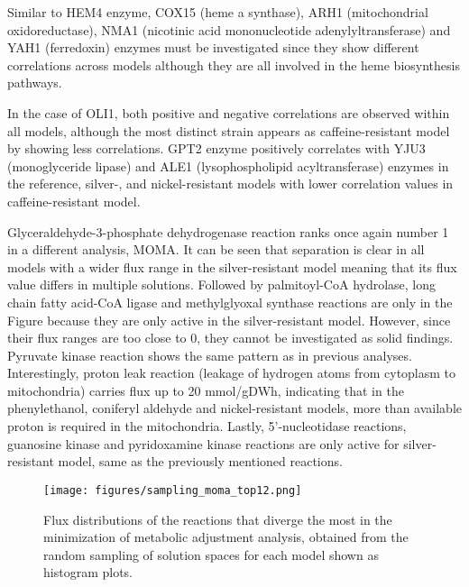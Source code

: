 Similar to HEM4 enzyme, COX15 (heme a synthase), ARH1 (mitochondrial oxidoreductase), NMA1 (nicotinic acid mononucleotide adenylyltransferase) and YAH1 (ferredoxin) enzymes must be investigated since they show different correlations across models although they are all involved in the heme biosynthesis pathways.

In the case of OLI1, both positive and negative correlations are observed within all models, although the most distinct strain appears as caffeine-resistant model by showing less correlations. GPT2 enzyme positively correlates with YJU3 (monoglyceride lipase) and ALE1 (lysophospholipid acyltransferase) enzymes in the reference, silver-, and nickel-resistant models with lower correlation values in caffeine-resistant model.

Glyceraldehyde-3-phosphate dehydrogenase reaction ranks once again number 1 in a different analysis, MOMA. It can be seen that separation is clear in all models with a wider flux range in the silver-resistant model meaning that its flux value differs in multiple solutions. Followed by palmitoyl-CoA hydrolase, long chain fatty acid-CoA ligase and methylglyoxal synthase reactions are only in the Figure because they are only active in the silver-resistant model. However, since their flux ranges are too close to 0, they cannot be investigated as solid findings. Pyruvate kinase reaction shows the same pattern as in previous analyses. Interestingly, proton leak reaction (leakage of hydrogen atoms from cytoplasm to mitochondria) carries flux up to 20 mmol/gDWh, indicating that in the phenylethanol, coniferyl aldehyde and nickel-resistant models, more than available proton is required in the mitochondria. Lastly, 5'-nucleotidase reactions, guanosine kinase and pyridoxamine kinase reactions are only active for silver-resistant model, same as the previously mentioned reactions.

\begin{figure}[H]
  \begin{center}
  \texttt{[image: figures/sampling\_moma\_top12.png]}
  \caption[Flux distributions of the reactions that diverge the most in the minimization of metabolic adjustment analysis, obtained from the random sampling of solution spaces for each model shown as histogram plots]{Flux distributions of the reactions that diverge the most in the minimization of metabolic adjustment analysis, obtained from the random sampling of solution spaces for each model shown as histogram plots.}
  \label{fig:sampling_moma_top12}
  \end{center}
\end{figure}

